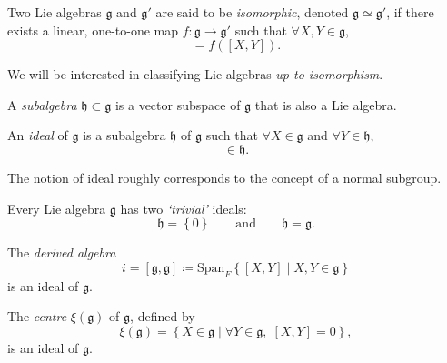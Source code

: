 \begin{definition}[isomorphism]
  Two Lie algebras $\mathfrak{g}$ and $\mathfrak{g}'$ are said to be \emph{isomorphic}, denoted $\mathfrak{g} \simeq \mathfrak{g}'$, if there exists a linear, one-to-one map $f: \mathfrak{g} \to \mathfrak{g}'$ such that $\forall X, Y \in \mathfrak{g}$,
  \begin{equation}
    [f(X), f(Y)] = f([X, Y]).
  \end{equation}
\end{definition}
We will be interested in classifying Lie algebras \emph{up to isomorphism}.

\begin{definition}[subalgebra]
  A \emph{subalgebra} $\mathfrak{h} \subset \mathfrak{g}$ is a vector subspace of $\mathfrak{g}$ that is also a Lie algebra.
\end{definition}

\begin{definition}[ideal]
  An \emph{ideal} of $\mathfrak{g}$ is a subalgebra $\mathfrak{h}$ of $\mathfrak{g}$ such that $\forall X \in \mathfrak{g}$ and $\forall Y \in \mathfrak{h}$,
  \begin{equation}
    [X, Y] \in \mathfrak{h}.
  \end{equation}
\end{definition}
The notion of ideal roughly corresponds to the concept of a normal subgroup.

\begin{example}
  Every Lie algebra $\mathfrak{g}$ has two \emph{`trivial'} ideals:
  \begin{equation}
    \mathfrak{h} = \left\{ 0 \right\} \qquad \text{and} \qquad \mathfrak{h} = \mathfrak{g}.
  \end{equation}
\end{example}
\begin{example}
  The \emph{derived algebra} 
  \begin{equation} 
    i = [\mathfrak{g}, \mathfrak{g}] \coloneq \text{Span}_F \left\{ [X, Y] \mid X, Y \in \mathfrak{g} \right\} 
  \end{equation} 
  is an ideal of $\mathfrak{g}$.
\end{example}
\begin{example}
  The \emph{centre} $\xi(\mathfrak{g})$ of $\mathfrak{g}$, defined by
  \begin{equation}
    \xi(\mathfrak{g}) = \left\{ X \in \mathfrak{g} \mid \forall Y \in \mathfrak{g},\; [X, Y] = 0 \right\},
  \end{equation}
  is an ideal of $\mathfrak{g}$.
\end{example}

